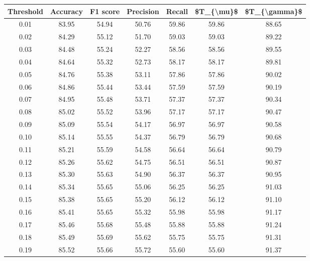 \begin{tabular}{|c|c|c|c|c|c|c|}
\hline
 Threshold &  Accuracy &  F1 score &  Precision &  Recall &  \$T\_\{\textbackslash mu\}\$ &  \$T\_\{\textbackslash gamma\}\$ \\
\hline
      0.01 &     83.95 &     54.94 &      50.76 &   59.86 &      59.86 &         88.65 \\
      0.02 &     84.29 &     55.12 &      51.70 &   59.03 &      59.03 &         89.22 \\
      0.03 &     84.48 &     55.24 &      52.27 &   58.56 &      58.56 &         89.55 \\
      0.04 &     84.64 &     55.32 &      52.73 &   58.17 &      58.17 &         89.81 \\
      0.05 &     84.76 &     55.38 &      53.11 &   57.86 &      57.86 &         90.02 \\
      0.06 &     84.86 &     55.44 &      53.44 &   57.59 &      57.59 &         90.19 \\
      0.07 &     84.95 &     55.48 &      53.71 &   57.37 &      57.37 &         90.34 \\
      0.08 &     85.02 &     55.52 &      53.96 &   57.17 &      57.17 &         90.47 \\
      0.09 &     85.09 &     55.54 &      54.17 &   56.97 &      56.97 &         90.58 \\
      0.10 &     85.14 &     55.55 &      54.37 &   56.79 &      56.79 &         90.68 \\
      0.11 &     85.21 &     55.59 &      54.58 &   56.64 &      56.64 &         90.79 \\
      0.12 &     85.26 &     55.62 &      54.75 &   56.51 &      56.51 &         90.87 \\
      0.13 &     85.30 &     55.63 &      54.90 &   56.37 &      56.37 &         90.95 \\
      0.14 &     85.34 &     55.65 &      55.06 &   56.25 &      56.25 &         91.03 \\
      0.15 &     85.38 &     55.65 &      55.20 &   56.12 &      56.12 &         91.10 \\
      0.16 &     85.41 &     55.65 &      55.32 &   55.98 &      55.98 &         91.17 \\
      0.17 &     85.46 &     55.68 &      55.48 &   55.88 &      55.88 &         91.24 \\
      0.18 &     85.49 &     55.69 &      55.62 &   55.75 &      55.75 &         91.31 \\
      0.19 &     85.52 &     55.66 &      55.72 &   55.60 &      55.60 &         91.37 \\

\end{tabular}

